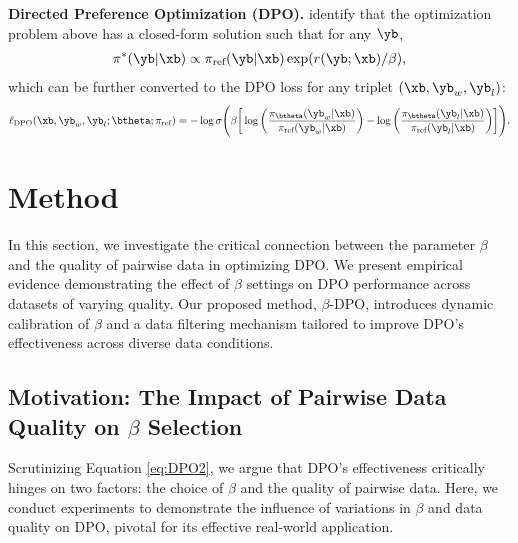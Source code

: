 \textbf{Directed Preference Optimization (DPO).}
\citet{DPO} identify that the optimization problem above has a closed-form solution such that for any $\yb$,
\begin{align*}
    \pi^*(\yb|\xb)
    \propto 
    \pi_{\text{ref}}(\yb|\xb)
    \exp( r(\yb; \xb) / \beta),
\end{align*}
which can be further converted to the DPO loss for any triplet $(\xb, \yb_{w}, \yb_{l})$:
\begin{equation}
    \ell_{\text{DPO}}(\xb, \yb_{w}, \yb_{l}; \btheta; \pi_{\text{ref}})
    = 
    -\log \sigma \Bigg(
    \beta \bigg[
    \log \bigg(\frac{\pi_{\btheta}(\yb_{w}|\xb)}{\pi_{\text{ref}}(\yb_{w}|\xb)}\bigg)
    -
    \log \bigg(\frac{\pi_{\btheta}(\yb_{l}|\xb)}{\pi_{\text{ref}}(\yb_{l}|\xb)}\bigg)
    \bigg]
    \Bigg).
    \label{eq:DPO2}
\end{equation}
\section{Method}
\label{our_work}
In this section, we investigate the critical connection between the parameter $\beta$ and the quality of pairwise data in optimizing DPO. We present empirical evidence demonstrating the effect of $\beta$ settings on DPO performance across datasets of varying quality. Our proposed method, $\beta$-DPO, introduces dynamic calibration of $\beta$ and a data filtering mechanism tailored to improve DPO's effectiveness across diverse data conditions.
\subsection{Motivation: The Impact of Pairwise Data Quality on $\beta$ Selection}
\label{motivation_sec}
Scrutinizing Equation \eqref{eq:DPO2}, we argue that DPO's effectiveness critically hinges on two factors: the choice of $\beta$ and the quality of pairwise data. Here, we conduct experiments to demonstrate the influence of variations in $\beta$ and data quality on DPO, pivotal for its effective real-world application.

